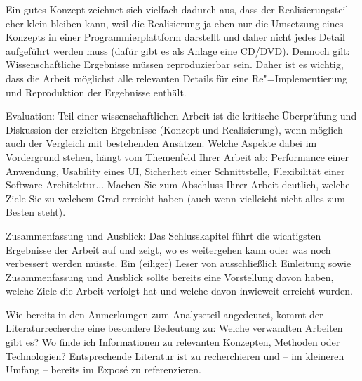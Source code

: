 \documentclass[11pt]{scrartcl}
\newcommand{\qto}[1]{\glqq #1\grqq}				%
\begin{document}
\begin{gliederung}
\begin{itemize}
	\end{itemize}
		
	\item[] Ein gutes Konzept zeichnet sich vielfach dadurch aus, dass der Realisierungsteil eher klein bleiben kann, weil die Realisierung ja eben \qto{nur} die Umsetzung eines Konzepts in einer Programmierplattform darstellt und daher nicht jedes Detail aufgeführt werden muss (dafür gibt es als Anlage eine CD/DVD). 
%	
	Dennoch gilt: Wissenschaftliche Ergebnisse müssen reproduzierbar sein. Daher ist es wichtig, dass die Arbeit möglichst alle relevanten Details für eine Re"=Implementierung und Reproduktion der Ergebnisse enthält.
	
	\item Evaluation: 
	Teil einer wissenschaftlichen Arbeit ist die kritische Überprüfung und Diskussion der erzielten Ergebnisse (Konzept und Realisierung), wenn möglich auch der Vergleich mit bestehenden Ansätzen.
	Welche Aspekte dabei im Vordergrund stehen, hängt vom Themenfeld Ihrer Arbeit ab: Performance einer Anwendung, Usability eines UI, Sicherheit einer Schnittstelle, Flexibilität einer Software-Architektur... Machen Sie zum Abschluss Ihrer Arbeit deutlich, welche Ziele Sie zu welchem Grad erreicht haben (auch wenn vielleicht nicht alles zum Besten steht).

	\item Zusammenfassung und Ausblick: Das Schlusskapitel führt die wichtigsten Ergebnisse der Arbeit auf und zeigt, wo es weitergehen kann oder was noch verbessert werden müsste. Ein (eiliger) Leser von ausschließlich Einleitung sowie Zusammenfassung und Ausblick sollte bereits eine Vorstellung davon haben, welche Ziele die Arbeit verfolgt hat und welche davon inwieweit erreicht wurden. 

\end{gliederung}

\noindent
Wie bereits in den Anmerkungen zum Analyseteil angedeutet, kommt der Literaturrecherche eine besondere Bedeutung zu: Welche verwandten Arbeiten gibt es? Wo finde ich Informationen zu relevanten Konzepten, Methoden oder Technologien? Entsprechende Literatur ist zu recherchieren und -- im kleineren Umfang -- bereits im Exposé zu referenzieren.
\end{document}
